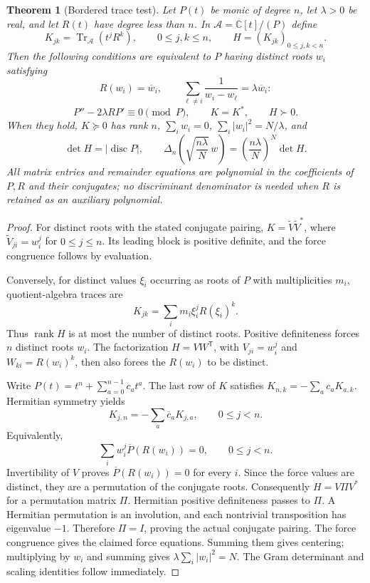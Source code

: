 \documentclass[11pt]{article}
\newtheorem{theorem}{Theorem}[section]
\theoremstyle{remark}
\newcommand{\C}{\mathbb C}
\numberwithin{equation}{section}
\begin{document}
\begin{theorem}[Bordered trace test]\label{thm:bordered-trace}
Let $P(t)$ be monic of degree $n$, let $\lambda>0$ be real,
and let $R(t)$ have degree less than $n$. In
$\mathcal A=\C[t]/(P)$ define
\[
 K_{jk}=\operatorname{Tr}_{\mathcal A}(t^jR^k),
 \qquad 0\le j,k\le n,
 \qquad H=(K_{jk})_{0\le j,k<n}.
\]
Then the following conditions are equivalent to $P$ having distinct
roots $w_i$ satisfying
\[
 R(w_i)=\overline w_i,
 \qquad \sum_{\ell\ne i}\frac1{w_i-w_\ell}
   =\lambda\overline w_i:
\]
\[
 P''-2\lambda RP'\equiv0\pmod P,
 \qquad K=K^*,\qquad H\succ0.
\]
When they hold, $K\succeq0$ has rank $n$,
$\sum_iw_i=0$, $\sum_i|w_i|^2=N/\lambda$, and
\[
 \det H=|\operatorname{disc}P|,\qquad
 \Delta_n\!\left(\sqrt{\frac{n\lambda}{N}}\,w\right)
 =\left(\frac{n\lambda}{N}\right)^N\det H.
\]
All matrix entries and remainder equations are polynomial in
the coefficients of $P,R$ and their conjugates; no discriminant
denominator is needed when $R$ is retained as an auxiliary polynomial.
\end{theorem}
\begin{proof}
For distinct roots with the stated conjugate pairing,
$K=\widetilde V\widetilde V^*$, where
$\widetilde V_{ji}=w_i^j$ for $0\le j\le n$. Its leading block
is positive definite, and the force congruence follows by evaluation.

Conversely, for distinct values $\xi_i$ occurring as roots of $P$
with multiplicities $m_i$, quotient-algebra traces are
\[
 K_{jk}=\sum_i m_i\xi_i^jR(\xi_i)^k.
\]
Thus $\operatorname{rank}H$ is at most the number of distinct roots.
Positive definiteness forces $n$ distinct roots $w_i$. The factorization
$H=V W^{\mathsf T}$, with $V_{ji}=w_i^j$ and
$W_{ki}=R(w_i)^k$, then also forces the $R(w_i)$ to be distinct.

Write $P(t)=t^n+\sum_{a=0}^{n-1}c_at^a$. The last row of $K$
satisfies $K_{n,k}=-\sum_a c_aK_{a,k}$. Hermitian symmetry yields
\[
 K_{j,n}=-\sum_a\overline c_aK_{j,a},\qquad0\le j<n.
\]
Equivalently,
\[
 \sum_i w_i^j\overline P(R(w_i))=0,\qquad0\le j<n.
\]
Invertibility of $V$ proves $\overline P(R(w_i))=0$ for every $i$.
Since the force values are distinct, they are a permutation of the
conjugate roots. Consequently $H=V\Pi V^*$ for a permutation matrix
$\Pi$. Hermitian positive definiteness passes to $\Pi$. A Hermitian
permutation is an involution, and each nontrivial transposition has
eigenvalue $-1$. Therefore $\Pi=I$, proving the actual conjugate pairing.
The force congruence gives the claimed force equations. Summing them
gives centering; multiplying by $w_i$ and summing gives
$\lambda\sum_i|w_i|^2=N$. The Gram determinant and scaling identities
follow immediately.
\end{proof}
\end{document}
